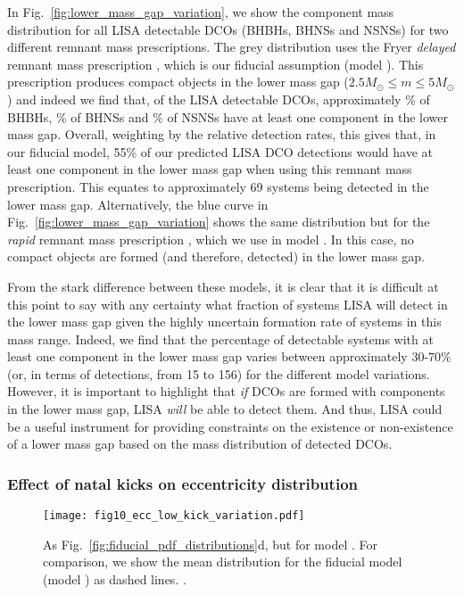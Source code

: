 In Fig.~\ref{fig:lower_mass_gap_variation}, we show the component mass distribution for all LISA detectable DCOs (BHBHs, BHNSs and NSNSs) for two different remnant mass prescriptions. The grey distribution uses the Fryer \textit{delayed} remnant mass prescription \citep{Fryer+2012}, which is our fiducial assumption (model \modFid{}). This prescription produces compact objects in the lower mass gap ($2.5 \unit{M_{\odot}} \le m \le 5 \unit{M_{\odot}}$) and indeed we find that, of the LISA detectable DCOs, approximately \BHBHatLeastOneLowerMassGapPerc{}\% of BHBHs, \BHNSatLeastOneLowerMassGapPerc{}\% of BHNSs and \NSNSatLeastOneLowerMassGapPerc{}\% of NSNSs have at least one component in the lower mass gap. Overall, weighting by the relative detection rates, this gives that, in our fiducial model, 55\% of our predicted LISA DCO detections would have at least one component in the lower mass gap when using this remnant mass prescription. This equates to approximately 69 systems being detected in the lower mass gap. Alternatively, the blue curve in Fig.~\ref{fig:lower_mass_gap_variation} shows the same distribution but for the \textit{rapid} remnant mass prescription \citep{Fryer+2012}, which we use in model \modRapid{}. In this case, no compact objects are formed (and therefore, detected) in the lower mass gap.

From the stark difference between these models, it is clear that it is difficult at this point to say with any certainty what fraction of systems LISA will detect in the lower mass gap given the highly uncertain formation rate of systems in this mass range. Indeed, we find that the percentage of detectable systems with at least one component in the lower mass gap varies between approximately 30-70\% (or, in terms of detections, from 15 to 156) for the different model variations. However, it is important to highlight that \textit{if} DCOs are formed with components in the lower mass gap, LISA \textit{will} be able to detect them. And thus, LISA could be a useful instrument for providing constraints on the existence or non-existence of a lower mass gap based on the mass distribution of detected DCOs.

\subsubsection{Effect of natal kicks on eccentricity distribution}

\begin{figure}[tb]
    \centering
    \texttt{[image: fig10\_ecc\_low\_kick\_variation.pdf]}
    \caption{As Fig.~\ref{fig:fiducial_pdf_distributions}d, but for model \modSigLower{}. For comparison, we show the mean distribution for the fiducial model (model \modFid{}) as dashed lines. \href{https://github.com/TomWagg/detecting-DCOs-in-LISA/blob/main/paper/figures/fig10_ecc_low_kick_variation.pdf}{\faFileImage} \href{https://github.com/TomWagg/detecting-DCOs-in-LISA/blob/main/paper/figure_notebooks/variations.ipynb}{\faBook}.}
    \label{fig:ecc_low_kick_variation}
\end{figure}

